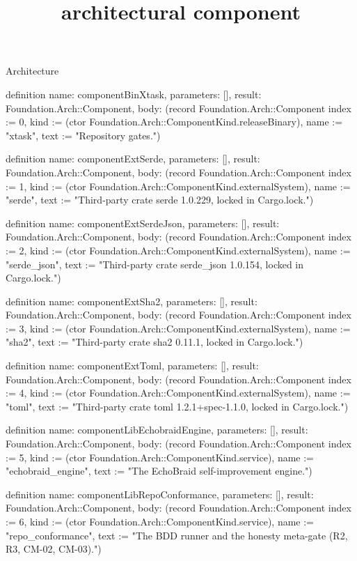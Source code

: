 \begin{lexlean}{Architecture}
\title{architectural component}
\begin{semanticmodule}
definition{
  name: componentBinXtask,
  parameters: [],
  result: Foundation.Arch::Component,
  body: (record Foundation.Arch::Component {index := 0, kind := (ctor Foundation.Arch::ComponentKind.releaseBinary), name := "xtask", text := "Repository gates."})
}

definition{
  name: componentExtSerde,
  parameters: [],
  result: Foundation.Arch::Component,
  body: (record Foundation.Arch::Component {index := 1, kind := (ctor Foundation.Arch::ComponentKind.externalSystem), name := "serde", text := "Third-party crate serde 1.0.229, locked in Cargo.lock."})
}

definition{
  name: componentExtSerdeJson,
  parameters: [],
  result: Foundation.Arch::Component,
  body: (record Foundation.Arch::Component {index := 2, kind := (ctor Foundation.Arch::ComponentKind.externalSystem), name := "serde_json", text := "Third-party crate serde_json 1.0.154, locked in Cargo.lock."})
}

definition{
  name: componentExtSha2,
  parameters: [],
  result: Foundation.Arch::Component,
  body: (record Foundation.Arch::Component {index := 3, kind := (ctor Foundation.Arch::ComponentKind.externalSystem), name := "sha2", text := "Third-party crate sha2 0.11.1, locked in Cargo.lock."})
}

definition{
  name: componentExtToml,
  parameters: [],
  result: Foundation.Arch::Component,
  body: (record Foundation.Arch::Component {index := 4, kind := (ctor Foundation.Arch::ComponentKind.externalSystem), name := "toml", text := "Third-party crate toml 1.2.1+spec-1.1.0, locked in Cargo.lock."})
}

definition{
  name: componentLibEchobraidEngine,
  parameters: [],
  result: Foundation.Arch::Component,
  body: (record Foundation.Arch::Component {index := 5, kind := (ctor Foundation.Arch::ComponentKind.service), name := "echobraid_engine", text := "The EchoBraid self-improvement engine."})
}

definition{
  name: componentLibRepoConformance,
  parameters: [],
  result: Foundation.Arch::Component,
  body: (record Foundation.Arch::Component {index := 6, kind := (ctor Foundation.Arch::ComponentKind.service), name := "repo_conformance", text := "The BDD runner and the honesty meta-gate (R2, R3, CM-02, CM-03)."})
}


\end{semanticmodule}
\end{lexlean}
